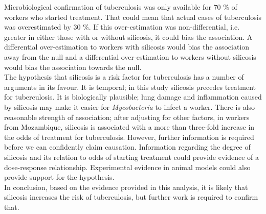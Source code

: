 \documentclass[11pt,a4paper,twoside]{article}\usepackage{graphicx, color}
\makeatletter
\newcommand\gobblepars{%
    \@ifnextchar\par%
        {\expandafter\gobblepars\@gobble}%
        {}}
\makeatother
\begin{document}
Microbiological confirmation of tuberculosis was only available for 70 \% of workers who started treatment. 
That could mean that actual cases of tuberculosis was overestimated by 30 \%. 
If this over-estimation was non-differential, i.e. greater in either those with or without silicosis, it could bias the association. 
A differential over-estimation to workers with silicosis would bias the association away from the null and a differential over-estimation to workers without silicosis would bias the association towards the null. \\ \indent
The hypothesis that silicosis is a risk factor for tuberculosis has a number of arguments in its favour. 
It is temporal; in this study silicosis precedes treatment for tuberculosis.
It is biologically plausible; lung damage and inflammation caused by silicosis may make it easier for \textit{Mycobacteria} to infect a worker. 
There is also reasonable strength of association; after adjusting for other factors, in workers from Mozambique, silicosis is associated with a more than three-fold increase in the odds of treatment for tuberculosis. 
However, further information is required before we can confidently claim causation. 
Information regarding the degree of silicosis and its relation to odds of starting treatment could provide evidence of a dose-response relationship. 
Experimental evidence in animal models could also provide support for the hypothesis. \\ \indent
In conclusion, based on the evidence provided in this analysis, it is likely that silicosis increases the risk of tuberculosis, but further work is required to confirm that.

\gobblepars
\end{document}

